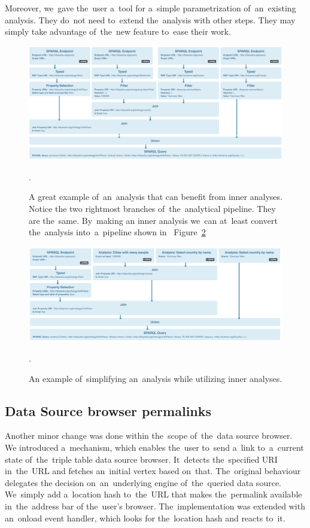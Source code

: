 Moreover, we~gave the~user a~tool for a~simple parametrization of~an~existing analysis. 
They do~not need to~extend the~analysis with other steps. They may simply take 
advantage of~the~new feature to~ease their work.

\begin{figure}
	\centering
	\includegraphics[width=140mm]{img/inner-example.png}
	\caption{A great example of~an~analysis that can benefit from inner analyses. Notice the
	two rightmost branches of~the~analytical pipeline. They are the~same. By~making
	an inner analysis we~can at~least convert the~analysis into~a~pipeline shown in~	Figure~\ref{fig:inner-example-simpler}}.
	\label{fig:inner-example}
\end{figure}

\begin{figure}
	\centering
	\includegraphics[width=140mm]{img/inner-example-simpler.png}
	\caption{An example of~simplifying an~analysis while utilizing inner analyses.}.
	\label{fig:inner-example-simpler}
\end{figure}

\subsection{Data Source browser permalinks}
Another minor change was done within the~scope of~the~data source browser.
We introduced a~mechanism, which enables the~user to~send a~link to~a~current 
state of~the~triple table data source browser. It~detects the~specified URI in~the~URL and fetches an~initial vertex based on~that. The~original behaviour delegates 
the decision on~an~underlying engine of~the~queried data source. We~simply add a~location hash to~the~URL that makes the~permalink available in~the~address bar 
of the~user's browser. The~implementation was extended with an~onload event 
handler, which looks for the~location hash and reacts to~it.


